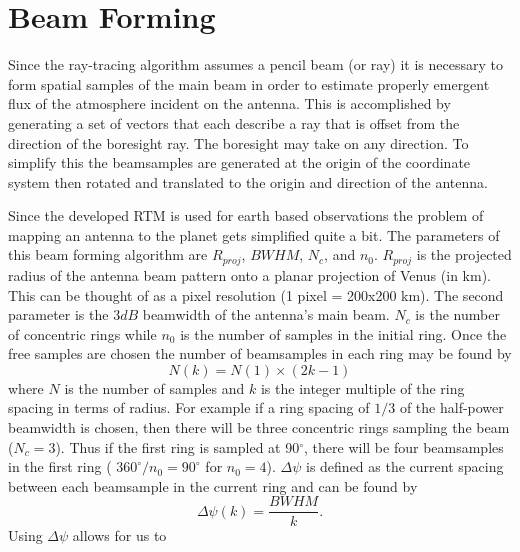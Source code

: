 \section{Beam Forming}

Since the ray-tracing algorithm assumes a pencil beam (or ray) it is necessary to form spatial samples of the main beam in order to estimate properly emergent flux of the atmosphere incident on the antenna. This is accomplished by generating a set of vectors that each describe a ray that is offset from the direction of the boresight ray. The boresight may take on any direction. To simplify this the beamsamples are generated at the origin of the coordinate system then rotated and translated to the origin and direction of the antenna.

Since the developed RTM is used for earth based observations the problem of mapping an antenna to the planet gets simplified quite a bit. The parameters of this beam forming algorithm are $R_{proj}$, $BWHM$, $N_c$, and $n_0$. $R_{proj}$ is the projected radius of the antenna beam pattern onto a planar projection of Venus (in km). This can be thought of as a pixel resolution (1 pixel = 200x200 km). The second parameter is the $3dB$ beamwidth of the antenna's main beam. $N_c$ is the number of concentric rings while $n_0$ is the number of samples in the initial ring. Once the free samples are chosen the number of beamsamples in each ring may be found by
\begin{equation}
N(k) = N(1) \times (2k-1)
\end{equation}
where $N$ is the number of samples and $k$ is the integer multiple of the ring spacing in terms of radius. For example if a ring spacing of $1/3$ of the half-power beamwidth is chosen, then there will be three concentric rings sampling the beam ($N_c=3$). Thus if the first ring is sampled at 90$^\circ$, there will be four beamsamples in the first ring ( $360^\circ / n_0 = 90^\circ$ for $n_0 = 4$). $\Delta\psi$ is defined as the current spacing between each beamsample in the current ring and can be found by
\begin{equation}
\Delta\psi(k) = \frac{BWHM}{k}.
\end{equation} 
Using $\Delta\psi$ allows for us to 